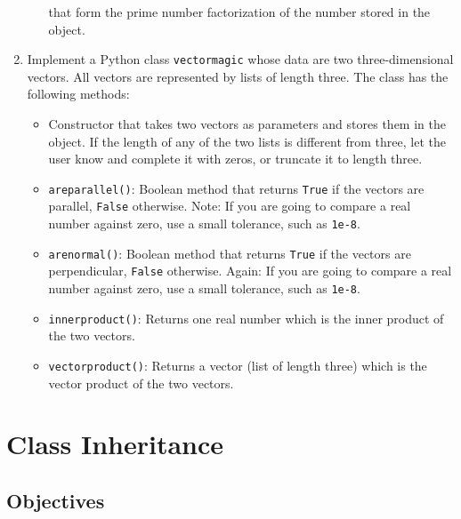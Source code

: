 \begin{enumerate}
\begin{itemize}
      that form the prime number factorization of the number stored in the object.
\end{itemize}
\item Implement a Python class {\tt vectormagic} whose data are two three-dimensional vectors.
      All vectors are represented by lists of length three. The class has the following methods:
\begin{itemize}
\item Constructor that takes two vectors as parameters and stores them in the object. 
      If the length of any of the two lists is different from three, let the user know and 
      complete it with zeros, or truncate it to length three. 
\item {\tt areparallel()}: Boolean method that returns {\tt True} if the vectors are parallel,
      {\tt False} otherwise. Note: If you are going to compare a real number against zero,
      use a small tolerance, such as {\tt 1e-8}.
\item {\tt arenormal()}: Boolean method that returns {\tt True} if the vectors are perpendicular,
      {\tt False} otherwise. Again: If you are going to compare a real number against zero,
      use a small tolerance, such as {\tt 1e-8}.
\item {\tt innerproduct()}: Returns one real number which is the inner product of the two vectors.
\item {\tt vectorproduct()}: Returns a vector (list of length three) which is the vector product 
      of the two vectors.
\end{itemize}
\end{enumerate}

\section{Class Inheritance}

\subsection{Objectives}

